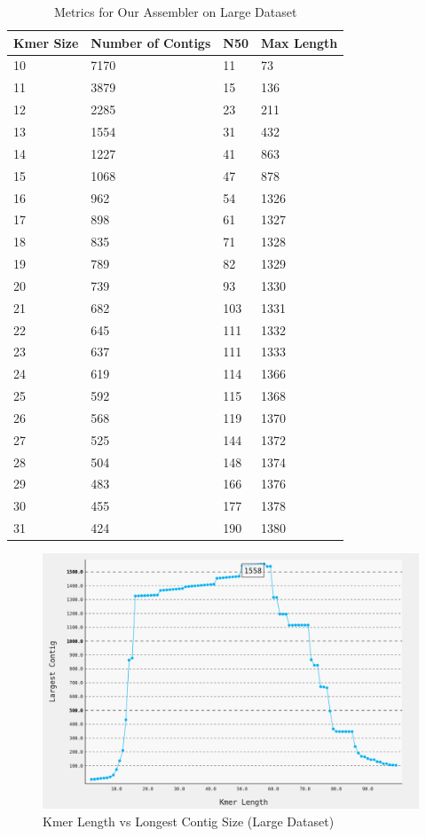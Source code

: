 \documentclass[12pt]{article}
\begin{document}
\begin{table}[p]
\centering
\begin{tabular}{|l|l|l|l|} \hline
Kmer Size &Number of Contigs &N50 &Max Length\\\hline
10 & 7170 & 11 & 73 \\
11 & 3879 & 15 & 136 \\
12 & 2285 & 23 & 211 \\
13 & 1554 & 31 & 432 \\
14 & 1227 & 41 & 863 \\
15 & 1068 & 47 & 878 \\
16 & 962 & 54 & 1326 \\
17 & 898 & 61 & 1327 \\
18 & 835 & 71 & 1328 \\
19 & 789 & 82 & 1329 \\
20 & 739 & 93 & 1330 \\
21 & 682 & 103 & 1331 \\
22 & 645 & 111 & 1332 \\
23 & 637 & 111 & 1333 \\
24 & 619 & 114 & 1366 \\
25 & 592 & 115 & 1368 \\
26 & 568 & 119 & 1370 \\
27 & 525 & 144 & 1372 \\
28 & 504 & 148 & 1374 \\
29 & 483 & 166 & 1376 \\
30 & 455 & 177 & 1378 \\
31 & 424 & 190 & 1380 \\ \hline
\end{tabular}
\caption{Metrics for Our Assembler on Large Dataset}
\label{table:kens}
\end{table}

\begin{figure}[p]
\centering
\includegraphics[width=5.25in]{klen_vs_largestcontig_large_fasta.png}
\caption{Kmer Length vs Longest Contig Size (Large Dataset)}
\label{fig:kmer_to_contig_large}
\end{figure}
\end{document}
